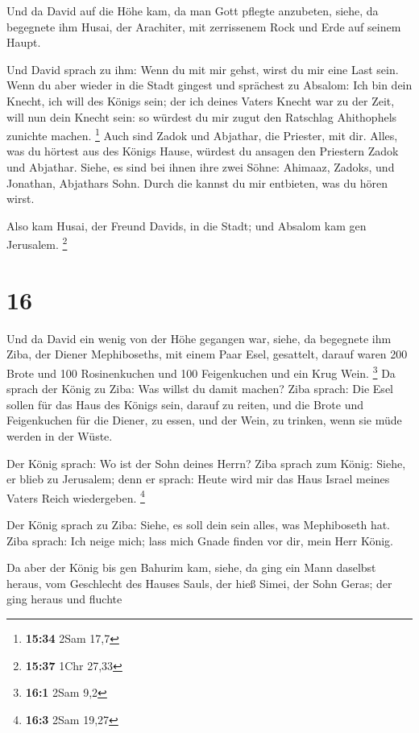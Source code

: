  Und da David auf die Höhe kam, da man Gott pflegte
anzubeten, siehe, da begegnete ihm Husai, der Arachiter, mit zerrissenem
Rock und Erde auf seinem Haupt.

 Und David sprach zu ihm: Wenn du mit mir gehst, wirst du
mir eine Last sein.  Wenn du aber wieder in die Stadt
gingest und sprächest zu Absalom: Ich bin dein Knecht, ich will des
Königs sein; der ich deines Vaters Knecht war zu der Zeit, will nun dein
Knecht sein: so würdest du mir zugut den Ratschlag Ahithophels zunichte
machen. \footnote{\textbf{15:34} 2Sam 17,7}  Auch sind
Zadok und Abjathar, die Priester, mit dir. Alles, was du hörtest aus des
Königs Hause, würdest du ansagen den Priestern Zadok und Abjathar.
 Siehe, es sind bei ihnen ihre zwei Söhne: Ahimaaz,
Zadoks, und Jonathan, Abjathars Sohn. Durch die kannst du mir entbieten,
was du hören wirst.

 Also kam Husai, der Freund Davids, in die Stadt; und
Absalom kam gen Jerusalem. \footnote{\textbf{15:37} 1Chr 27,33}

\hypertarget{section-2}{%
\section{16}\label{section-2}}

 Und da David ein wenig von der Höhe gegangen war, siehe,
da begegnete ihm Ziba, der Diener Mephiboseths, mit einem Paar Esel,
gesattelt, darauf waren 200 Brote und 100 Rosinenkuchen und 100
Feigenkuchen und ein Krug Wein. \footnote{\textbf{16:1} 2Sam 9,2}
 Da sprach der König zu Ziba: Was willst du damit machen?
Ziba sprach: Die Esel sollen für das Haus des Königs sein, darauf zu
reiten, und die Brote und Feigenkuchen für die Diener, zu essen, und der
Wein, zu trinken, wenn sie müde werden in der Wüste.

 Der König sprach: Wo ist der Sohn deines Herrn? Ziba
sprach zum König: Siehe, er blieb zu Jerusalem; denn er sprach: Heute
wird mir das Haus Israel meines Vaters Reich wiedergeben. \footnote{\textbf{16:3}
  2Sam 19,27}

 Der König sprach zu Ziba: Siehe, es soll dein sein alles,
was Mephiboseth hat. Ziba sprach: Ich neige mich; lass mich Gnade finden
vor dir, mein Herr König.

 Da aber der König bis gen Bahurim kam, siehe, da ging ein
Mann daselbst heraus, vom Geschlecht des Hauses Sauls, der hieß Simei,
der Sohn Geras; der ging heraus und fluchte

